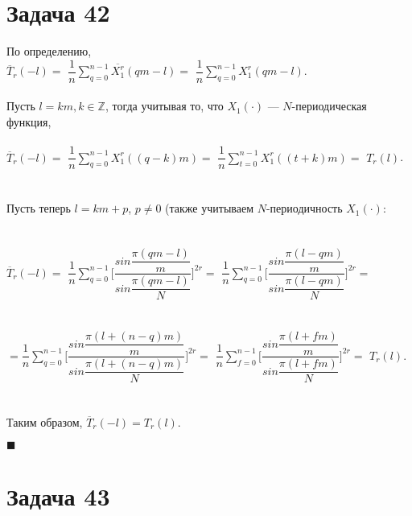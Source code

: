 \documentclass{article}
\title{}
\author{
	Дерюгин Денис, студент 561-й учебной группы
}
\date{\today}
\newcommand\proofend{\begin{flushright}$\blacksquare$\end{flushright}}
\begin{document}
\maketitle
\setcounter{MaxMatrixCols}{20}

\large {
\section*{Задача 42}
По определению, \\
$\overline{T}_r(-l) =$
$\dfrac{1}{n}\sum\limits_{q=0}^{n-1} \overline{X_1^r}(qm - l) = $
$\dfrac{1}{n}\sum\limits_{q=0}^{n-1} X_1^r(qm - l)$.\\ \\
Пусть $l = km, k \in \mathbb{Z}$, тогда учитывая то, что $X_1(\cdot)$ --- $N$-периодическая функция,\\ \\
$\overline{T}_r(-l) = $
$\dfrac{1}{n}\sum\limits_{q=0}^{n-1} X_1^r((q - k)m) = $
$\dfrac{1}{n}\sum\limits_{t=0}^{n-1} X_1^r((t + k)m) = $
$T_r(l)$. \\ \\ \\
Пусть теперь $l = km + p$, $p \neq 0$ (также учитываем $N$-периодичность $X_1(\cdot)$:\\ \\ \\
$\overline{T}_r(-l) = $
$\dfrac{1}{n}\sum\limits_{q=0}^{n-1} \Bigg [ \dfrac{sin\dfrac{\pi(qm - l)}{m}}{sin\dfrac{\pi(qm - l)}{N}} \Bigg ]^{2r}= $
$\dfrac{1}{n}\sum\limits_{q=0}^{n-1} \Bigg [ \dfrac{sin\dfrac{\pi(l - qm)}{m}}{sin\dfrac{\pi(l - qm)}{N}} \Bigg ]^{2r}= $ \\ \\ \\
$= \dfrac{1}{n}\sum\limits_{q=0}^{n-1} \Bigg [ \dfrac{sin\dfrac{\pi(l + (n - q)m)}{m}}{sin\dfrac{\pi(l + (n - q)m)}{N}} \Bigg ]^{2r}= $
$\dfrac{1}{n}\sum\limits_{f=0}^{n-1} \Bigg [ \dfrac{sin\dfrac{\pi(l + fm)}{m}}{sin\dfrac{\pi(l + fm)}{N}} \Bigg ]^{2r}= $
$T_r(l)$. \\ \\ \\
Таким образом, $\overline{T}_r(-l) = T_r(l)$.

\proofend
\pagebreak
\section*{Задача 43}

}
\end{document}
